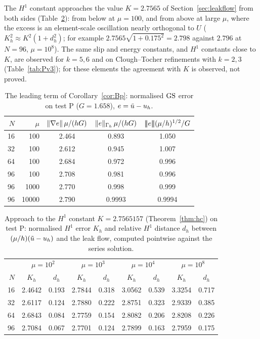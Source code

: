 The $H^1$ constant approaches the value $K=2.7565$ of Section~\ref{sec:leakflow} from both sides (Table~\ref{tab:hc}): from below at $\mu=100$, and from above at large $\mu$, where the excess is an element-scale oscillation nearly orthogonal to $U$ ($K_h^2\approx K^2(1+d_h^2)$; for example $2.7565\sqrt{1+0.175^2}=2.798$ against $2.796$ at $N=96$, $\mu=10^8$). The same slip and energy constants, and $H^1$ constants close to $K$, are observed for $k=5,6$ and on Clough--Tocher refinements with $k=2,3$ (Table~\ref{tab:Pv3}); for these elements the agreement with $K$ is observed, not proved.

\begin{table}[t]
\centering\small
\caption{The leading term of Corollary~\ref{cor:Bp}: normalised $\mathrm{GS}$ error on test P ($G=1.658$), $e=\tilde u-u_h$.}\label{tab:P}
\begin{tabular}{rrccc}
\toprule
$N$ & $\mu$ & $\lVert \nabla e\rVert\,\mu/(hG)$ & $\lVert e\rVert_{\Gamma_h}\,\mu/(hG)$ & $|\!|\!|e|\!|\!|(\mu/h)^{1/2}/G$\\
\midrule
16 & 100 & 2.464 & 0.893 & 1.050\\
32 & 100 & 2.612 & 0.945 & 1.007\\
64 & 100 & 2.684 & 0.972 & 0.996\\
96 & 100 & 2.708 & 0.981 & 0.996\\
96 & 1000 & 2.770 & 0.998 & 0.999\\
96 & 10000 & 2.790 & 0.9993 & 0.9994\\
\bottomrule
\end{tabular}
\end{table}

\begin{table}[t]
\centering\small
\caption{Approach to the $H^1$ constant $K=2.7565157$ (Theorem~\ref{thm:hc}) on test P: normalised $H^1$ error $K_h$ and relative $H^1$ distance $d_h$ between $(\mu/h)(\tilde u-u_h)$ and the leak flow, computed pointwise against the series solution.}\label{tab:hc}
\begin{tabular}{r|cc|cc|cc|cc}
\toprule
 & \multicolumn{2}{c|}{$\mu=10^2$} & \multicolumn{2}{c|}{$\mu=10^3$} & \multicolumn{2}{c|}{$\mu=10^4$} & \multicolumn{2}{c}{$\mu=10^8$}\\
$N$ & $K_h$ & $d_h$ & $K_h$ & $d_h$ & $K_h$ & $d_h$ & $K_h$ & $d_h$\\
\midrule
16 & 2.4642 & 0.193 & 2.7844 & 0.318 & 3.0562 & 0.539 & 3.3254 & 0.717\\
32 & 2.6117 & 0.124 & 2.7880 & 0.222 & 2.8751 & 0.323 & 2.9339 & 0.385\\
64 & 2.6843 & 0.084 & 2.7759 & 0.154 & 2.8082 & 0.206 & 2.8208 & 0.226\\
96 & 2.7084 & 0.067 & 2.7701 & 0.124 & 2.7899 & 0.163 & 2.7959 & 0.175\\
\bottomrule
\end{tabular}
\end{table}

